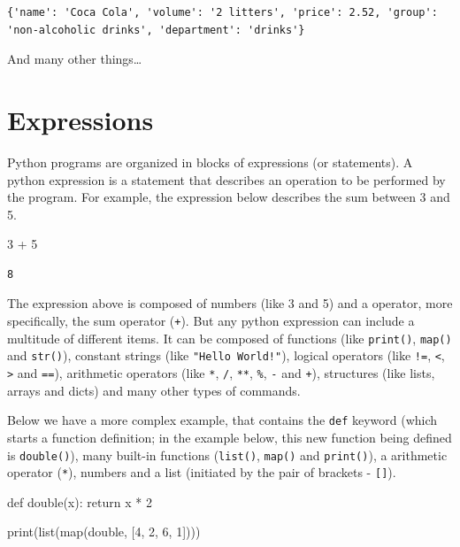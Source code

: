 \documentclass[
  11pt,
  letterpaper,
  DIV=11,
  numbers=noendperiod]{scrreprt}
\newenvironment{Shaded}{\begin{snugshade}}{\end{snugshade}}
\newcommand{\BuiltInTok}[1]{\textcolor[rgb]{0.00,0.23,0.31}{#1}}
\newcommand{\ControlFlowTok}[1]{\textcolor[rgb]{0.00,0.23,0.31}{#1}}
\newcommand{\DecValTok}[1]{\textcolor[rgb]{0.68,0.00,0.00}{#1}}
\newcommand{\KeywordTok}[1]{\textcolor[rgb]{0.00,0.23,0.31}{#1}}
\newcommand{\NormalTok}[1]{\textcolor[rgb]{0.00,0.23,0.31}{#1}}
\newcommand{\OperatorTok}[1]{\textcolor[rgb]{0.37,0.37,0.37}{#1}}
\begin{document}
\begin{verbatim}
{'name': 'Coca Cola', 'volume': '2 litters', 'price': 2.52, 'group': 'non-alcoholic drinks', 'department': 'drinks'}
\end{verbatim}

And many other things\ldots{}

\hypertarget{expressions}{%
\section{Expressions}\label{expressions}}

Python programs are organized in blocks of expressions (or statements).
A python expression is a statement that describes an operation to be
performed by the program. For example, the expression below describes
the sum between 3 and 5.

\begin{Shaded}
\begin{Highlighting}[]
\DecValTok{3} \OperatorTok{+} \DecValTok{5}
\end{Highlighting}
\end{Shaded}

\begin{verbatim}
8
\end{verbatim}

The expression above is composed of numbers (like 3 and 5) and a
operator, more specifically, the sum operator (\texttt{+}). But any
python expression can include a multitude of different items. It can be
composed of functions (like \texttt{print()}, \texttt{map()} and
\texttt{str()}), constant strings (like \texttt{"Hello\ World!"}),
logical operators (like \texttt{!=}, \texttt{\textless{}},
\texttt{\textgreater{}} and \texttt{==}), arithmetic operators (like
\texttt{*}, \texttt{/}, \texttt{**}, \texttt{\%}, \texttt{-} and
\texttt{+}), structures (like lists, arrays and dicts) and many other
types of commands.

Below we have a more complex example, that contains the \texttt{def}
keyword (which starts a function definition; in the example below, this
new function being defined is \texttt{double()}), many built-in
functions (\texttt{list()}, \texttt{map()} and \texttt{print()}), a
arithmetic operator (\texttt{*}), numbers and a list (initiated by the
pair of brackets - \texttt{{[}{]}}).

\begin{Shaded}
\begin{Highlighting}[]
\KeywordTok{def}\NormalTok{ double(x):}
  \ControlFlowTok{return}\NormalTok{ x }\OperatorTok{*} \DecValTok{2}
  
\BuiltInTok{print}\NormalTok{(}\BuiltInTok{list}\NormalTok{(}\BuiltInTok{map}\NormalTok{(double, [}\DecValTok{4}\NormalTok{, }\DecValTok{2}\NormalTok{, }\DecValTok{6}\NormalTok{, }\DecValTok{1}\NormalTok{])))}
\end{Highlighting}
\end{Shaded}
\end{document}
